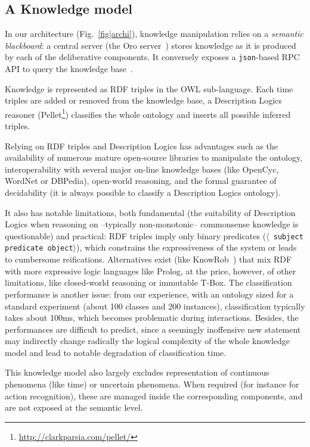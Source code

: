 \documentclass[preprint,12pt]{elsarticle}
\newcommand{\stmt}[1]{{\footnotesize \tt $\langle$ #1\relax$\rangle$}}
\begin{document}
\subsection{A Knowledge model}

In our architecture (Fig.~\ref{fig|archi}), knowledge manipulation relies on a
\emph{semantic blackboard}: a central server (the {\sc Oro}
server~\cite{Lemaignan2010}) stores knowledge as it is produced by each of the
deliberative components. It conversely exposes a {\tt json}-based RPC API to
query the knowledge base~\cite{lemaignan2012kbapi}.

Knowledge is represented as RDF triples in the OWL sub-language. Each
time triples are added or removed from the knowledge base, a Description
Logics reasoner ({\sc Pellet}\footnote{\url{http://clarkparsia.com/pellet/}})
classifies the whole ontology and inserts all possible inferred triples.

Relying on RDF triples and Description Logics has advantages such as the
availability of numerous mature open-source libraries to manipulate the ontology,
interoperability with several major on-line knowledge bases (like {\sc
OpenCyc}, {\sc WordNet} or {\sc DBPedia}), open-world reasoning, and the formal
guarantee of decidability (it is always possible to classify a Description
Logics ontology).

It also has notable limitations, both fundamental (the suitability
of Description Logics when reasoning on --typically non-monotonic-- commonsense
knowledge is questionable) and practical: RDF triples imply only binary predicates
(\stmt{subject predicate object}), which constrains the expressiveness of the
system or leads to cumbersome reifications. Alternatives exist (like {\sc
KnowRob}~\cite{Tenorth2009a}) that mix RDF with more expressive logic
languages like {\sc Prolog}, at the price, however, of other limitations, like
closed-world reasoning or immutable T-Box. The classification
performance is another issue: from our experience, with an ontology sized for a
standard experiment (about 100 classes and 200 instances), classification
typically takes about 100ms, which becomes problematic during interactions.
Besides, the performances are difficult to predict, since a seemingly
inoffensive new statement may indirectly change radically the logical
complexity of the whole knowledge model and lead to notable degradation of
classification time.

This knowledge model also largely excludes representation of continuous
phenomena (like time) or uncertain phenomena. When required (for instance for
action recognition), these are managed inside the corresponding components, and
are not exposed at the semantic level.
\end{document}
